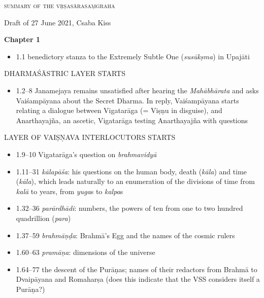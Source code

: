 \documentclass[11pt]{book} %
\newcommand{\skt}[1]{\textit{#1}}
\begin{document}
\begin{center}
\textsc{\Large summary of the vṛṣasārasaṃgraha}
\medskip

Draft of 27 June 2021, Csaba Kiss
\end{center}

\bigskip


\thispagestyle{empty}
\textbf{Chapter 1}
\begin{itemize}
\item 1.1 benedictory stanza to the Extremely 
Subtle One (\skt{susūkṣma}) in Upajāti
\end{itemize}


\begin{center}
 DHARMAŚĀSTRIC LAYER STARTS
\end{center}

\begin{itemize}
\item 1.2--8 
   Janamejaya remains unsatisfied after hearing the 
   \skt{Mahābhārata} and asks Vaiśampāyana about
   the Secret Dharma. In reply, Vaiśam\-pāyana starts
   relating a dialogue between Vigatarāga (= Viṣṇu in disguise),
   and Anartha\-yajña, an ascetic, Vigatarāga testing Anartha\-yajña
   with questions
   \end{itemize}
   \begin{center}
 LAYER OF VAIṢṆAVA INTERLOCUTORS STARTS
\end{center}

\begin{itemize}

\item 1.9--10 Vigatarāga's question on \skt{brahmavidyā}
\item 1.11--31 \skt{kālapāśa}: his questions on the human body, 
   death (\skt{kāla}) and
    time (\skt{kāla}), 
   which leads naturally to an enumeration of the 
   divisions of time from \skt{kalā} to years, from \skt{yuga}s
   to \skt{kalpa}s
\item 1.32--36 \skt{parārdhādi}: numbers, the powers of
   ten from one to two hundred quadrillion (\skt{para})
\item 1.37--59 \skt{brahmāṇḍa}: Brahmā's Egg and the names of 
    the cosmic rulers
\item 1.60--63 \skt{pramāṇa}:  dimensions of the universe
\item 1.64--77 the descent of the Purāṇas; 
    names of their redactors from Brahmā to
    Dvaipāyana and Romaharṣa (does this indicate that the VSS 
    considers itself a Purāṇa?)
\end{itemize}
\end{document}
